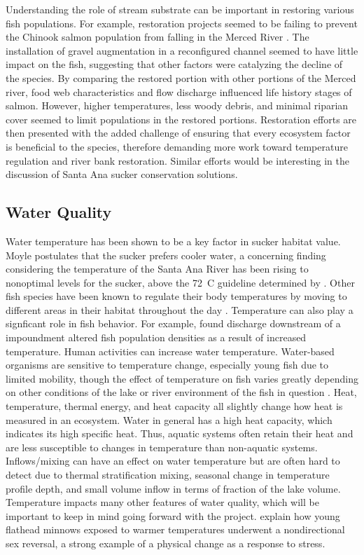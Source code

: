 \documentclass{article}\usepackage[]{graphicx}\usepackage[]{color}
\begin{document}
Understanding the role of stream substrate can be important in restoring various fish populations. For example, restoration projects seemed to be failing to prevent the Chinook salmon population from falling in the Merced River \citep{albertson13}. The installation of gravel augmentation in a reconfigured channel seemed to have little impact on the fish, suggesting that other factors were catalyzing the decline of the species. By comparing the restored portion with other portions of the Merced river, food web characteristics and flow discharge influenced life history stages of salmon. However, higher temperatures, less woody debris, and minimal riparian cover seemed to limit populations in the restored portions. Restoration efforts are then presented with the added challenge of ensuring that every ecosystem factor is beneficial to the species, therefore demanding more work toward temperature regulation and river bank restoration. Similar efforts would be interesting in the discussion of Santa Ana sucker conservation solutions.

\subsection{Water Quality}

Water temperature has been shown to be a key factor in sucker habitat value. Moyle \citet{moyle2002inland} postulates that the sucker prefers cooler water, a concerning finding considering the temperature of the Santa Ana River has been rising to nonoptimal levels for the sucker, above the 72\textdegree~C guideline determined by \citet{baskerville2012recovery}. Other fish species have been known to regulate their body temperatures by moving to different areas in their habitat throughout the day \citep{matthews1994cool}. Temperature can also play a signficant role in fish behavior. For example, \citet{sadler1980effect} found discharge downstream of a impoundment altered fish population densities as a result of increased temperature. Human activities can increase water temperature. Water-based organisms are sensitive to temperature change, especially young fish due to limited mobility, though the effect of temperature on fish varies greatly depending on other conditions of the lake or river environment of the fish in question \citep{loshuertos16}. Heat, temperature, thermal energy, and heat capacity all slightly change how heat is measured in an ecosystem. Water in general has a high heat capacity, which indicates its high specific heat. Thus, aquatic systems often retain their heat and are less susceptible to changes in temperature than non-aquatic systems. Inflows/mixing can have an effect on water temperature but are often hard to detect due to thermal stratification mixing, seasonal change in temperature profile depth, and small volume inflow in terms of fraction of the lake volume. Temperature impacts many other features of water quality, which will be important to keep in mind going forward with the project. \citet{coulter2015fluctuating} explain how young flathead minnows exposed to warmer temperatures underwent a nondirectional sex reversal, a strong example of a physical change as a response to stress.
\end{document}

